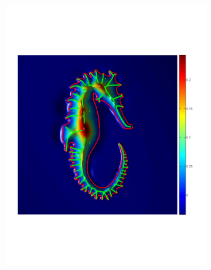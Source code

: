\documentclass[review]{acmsiggraph}
\begin{document}
\begin{figure}
\begin{subfigure}[b]{0.34\linewidth}
                \includegraphics[width=\textwidth]{images/seahorse/2.pdf}
        \end{subfigure}
~
		\begin{subfigure}[b]{0.25\linewidth}
                \centering

\end{subfigure}
\end{figure}
\end{document}
